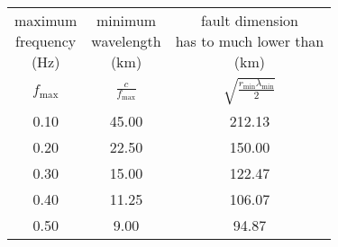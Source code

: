 \begin{tabular}{ccc}
\makecell{maximum \\ frequency \\ (Hz)} & \makecell{minimum  \\ wavelength \\(km)} & \makecell{fault dimension \\ has to much lower than \\(km)}\\
$f_{\text{max}}$ & $\frac{c}{f_{\text{max}}}$ & $\sqrt{\frac{r_{\text{min}}\lambda_{\text{min}}}{2}}$\\
0.10 & 45.00 & 212.13\\
0.20 & 22.50 & 150.00\\
0.30 & 15.00 & 122.47\\
0.40 & 11.25 & 106.07\\
0.50 & 9.00 & 94.87\\
\end{tabular}
